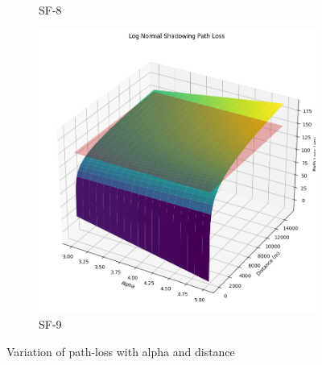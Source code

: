 \begin{figure}
\begin{subfigure}[b]{0,45\textwidth}
         \caption{SF-8}
         \label{fig:SF-8}
     \end{subfigure}
     \hfill
     \begin{subfigure}[b]{0,45\textwidth}
         \centering
         \includegraphics[width=\textwidth]{images/sf-9.jpg}
         \caption{SF-9}
         \label{fig:sf-9}
     \end{subfigure}
        \caption{Variation of path-loss with alpha and distance}
        \label{fig:initial graphs}
\end{figure}



